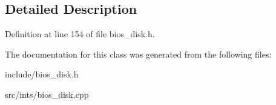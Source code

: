 \subsection{Detailed Description}


Definition at line 154 of file bios\-\_\-disk.\-h.



The documentation for this class was generated from the following files\-:\begin{DoxyCompactItemize}
\item 
include/bios\-\_\-disk.\-h\item 
src/ints/bios\-\_\-disk.\-cpp\end{DoxyCompactItemize}
